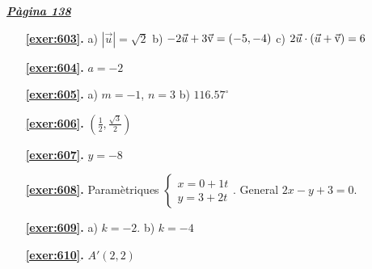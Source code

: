 \hyperlink{page.138}{\textbf{\em Pàgina 138}}
\begin{enumerate}
\item[\fontfamily{phv}\selectfont\color{blue}\textbf{\ref{exer:603}. }] \label{ans:603} 
a) $|\vec u|=\sqrt {2}$ b) $-2\vec u + 3\vec{\mathrm{v}} =(-5,-4)$ c) $2\vec u \cdot (\vec u + \vec{\mathrm{v}} )=6$
 \end{enumerate}
\begin{enumerate}
\item[\fontfamily{phv}\selectfont\color{blue}\textbf{\ref{exer:604}. }] \label{ans:604} 
 $a=-2$
\item[\fontfamily{phv}\selectfont\color{blue}\textbf{\ref{exer:605}. }] \label{ans:605} 
a) $m=-1$, $n=3$ b) $116.57^\circ $
\item[\fontfamily{phv}\selectfont\color{blue}\textbf{\ref{exer:606}. }] \label{ans:606} 
$(\frac {1}{2}, \frac {\sqrt {3}}{2})$
\item[\fontfamily{phv}\selectfont\color{blue}\textbf{\ref{exer:607}. }] \label{ans:607} 
$y=-8$
\item[\fontfamily{phv}\selectfont\color{blue}\textbf{\ref{exer:608}. }] \label{ans:608} 
Paramètriques $\left \{\begin {array}{l} x=0+1t \\ y=3+2t \end {array}\right .$. General $2x-y+3=0$.
\item[\fontfamily{phv}\selectfont\color{blue}\textbf{\ref{exer:609}. }] \label{ans:609} 
a) $k=-2$. b) $k=-4$
\item[\fontfamily{phv}\selectfont\color{blue}\textbf{\ref{exer:610}. }] \label{ans:610} 
$A'(2,2)$
 \end{enumerate}
\vspace{0.3cm}


